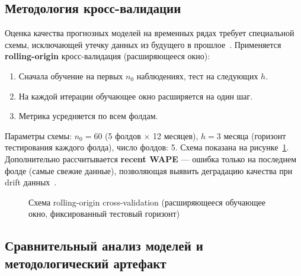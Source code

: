 \subsection{Методология кросс-валидации}

Оценка качества прогнозных моделей на временных рядах требует специальной схемы, исключающей утечку данных из будущего в прошлое~\cite{kaufman2012leakage}. Применяется \textbf{rolling-origin} кросс-валидация (расширяющееся окно):
\begin{enumerate}
  \item Сначала обучение на первых $n_0$ наблюдениях, тест на следующих $h$.
  \item На каждой итерации обучающее окно расширяется на один шаг.
  \item Метрика усредняется по всем фолдам.
\end{enumerate}

Параметры схемы: $n_0 = 60$ (5 фолдов $\times$ 12 месяцев), $h = 3$ месяца (горизонт тестирования каждого фолда), число фолдов: 5. Схема показана на рисунке~\ref{fig:rolling_origin}. Дополнительно рассчитывается \textbf{recent WAPE} --- ошибка только на последнем фолде (самые свежие данные), позволяющая выявить деградацию качества при drift данных~\cite{widmer1996learning}.

\begin{figure}[H]
\centering
{}
\caption{Схема rolling-origin cross-validation (расширяющееся обучающее окно, фиксированный тестовый горизонт)}
\label{fig:rolling_origin}
\end{figure}

\subsection{Сравнительный анализ моделей и методологический артефакт}

